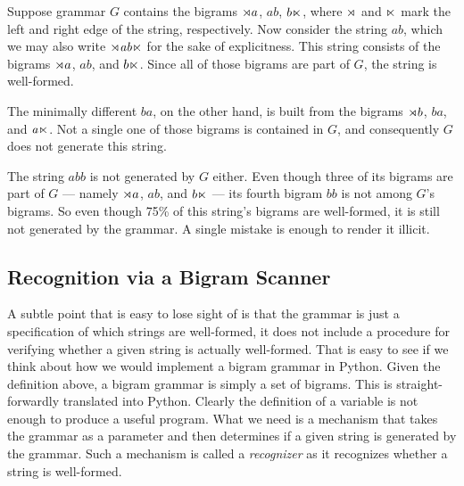 \begin{examplebox}
    \label{ex:SL_BigramGrammar}%
    Suppose grammar $G$ contains the bigrams $\rtimes a$, $\mathit{ab}$, $b \ltimes$, where $\rtimes$ and $\ltimes$ mark the left and right edge of the string, respectively.
    Now consider the string $\mathit{ab}$, which we may also write $\rtimes \mathit{ab} \ltimes$ for the sake of explicitness.
    This string consists of the bigrams $\rtimes a$, $\mathit{ab}$, and $b \ltimes$.
    Since all of those bigrams are part of $G$, the string is well-formed. 

    The minimally different $\mathit{ba}$, on the other hand, is built from the bigrams $\rtimes b$, $\mathit{ba}$, and $\mathit{a \ltimes}$.
    Not a single one of those bigrams is contained in $G$, and consequently $G$ does not generate this string.

    The string $\mathit{abb}$ is not generated by $G$ either.
    Even though three of its bigrams are part of $G$ --- namely $\rtimes a$, $\mathit{ab}$, and $b \ltimes$ --- its fourth bigram $\mathit{bb}$ is not among $G$'s bigrams.
    So even though 75\% of this string's bigrams are well-formed, it is still not generated by the grammar.
    A single mistake is enough to render it illicit.
\end{examplebox}

\subsection{Recognition via a Bigram Scanner}
A subtle point that is easy to lose sight of is that the grammar is just a specification of which strings are well-formed, it does not include a procedure for verifying whether a given string is actually well-formed.
That is easy to see if we think about how we would implement a bigram grammar in Python.
Given the definition above, a bigram grammar is simply a set of bigrams.
This is straight-forwardly translated into Python.
%
%
Clearly the definition of a variable is not enough to produce a useful program.
What we need is a mechanism that takes the grammar as a parameter and then determines if a given string is generated by the grammar.
Such a mechanism is called a \emph{recognizer} as it recognizes whether a string is well-formed.

